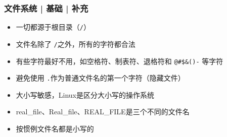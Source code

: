 \begin{frame}[fragile]
  \frametitle{文件系统 | 基础 | \alert{补充}}
  \begin{itemize}[<+->]
    \item 一切都源于根目录（\verb|/|）
    \item 文件名除了 \verb|/|之外，所有的字符都合法
    \item 有些字符最好不用，如空格符、制表符、退格符和 \verb|@#$&()-| 等字符
    \item 避免使用 \verb|.|作为普通文件名的第一个字符（隐藏文件）
    \item 大小写敏感，Linux是区分大小写的操作系统
    \item real\_file、Real\_file、REAL\_FILE是三个不同的文件名
    \item 按惯例文件名都是小写的
  \end{itemize}
\end{frame}


